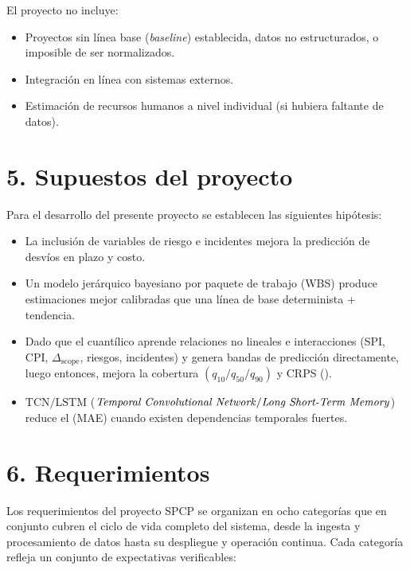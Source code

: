 \documentclass[12pt]
{charter}
\begin{document}
El proyecto no incluye:
\begin{itemize}
	\item Proyectos sin línea base (\textit{baseline}) establecida, datos no estructurados, o imposible de ser normalizados.
	\item Integración en línea con sistemas externos.
	\item Estimación de recursos humanos a nivel individual (si hubiera faltante de datos). 
\end{itemize}

\section{5. Supuestos del proyecto}
\label{sec:supuestos}

Para el desarrollo del presente proyecto se establecen las siguientes hipótesis:

\begin{itemize}
	\item La inclusión de variables de riesgo e incidentes mejora la predicción de desvíos en plazo y costo.
	\item Un modelo jerárquico bayesiano por paquete de trabajo (WBS) produce estimaciones mejor calibradas que una línea de base determinista + tendencia.
	\item Dado que el  cuantílico aprende relaciones no lineales e interacciones (SPI, CPI, $\Delta_{\text{scope}}$, riesgos, incidentes) y genera bandas de predicción directamente, luego entonces, mejora la cobertura $(q_{10}/q_{50}/q_{90})$ y CRPS ().
	\item $\text{TCN} / \text{LSTM}$ ($\text{\textit{Temporal Convolutional Network}} / \text{\textit{Long Short-Term Memory}}$) reduce el  (MAE) cuando existen dependencias temporales fuertes.
\end{itemize}


\section{6. Requerimientos}
\label{sec:requerimientos}

Los requerimientos del proyecto SPCP se organizan en ocho categorías que en conjunto cubren el ciclo de vida completo del sistema, desde la ingesta y procesamiento de datos hasta su despliegue y operación continua. 
Cada categoría refleja un conjunto de expectativas verificables: 
\end{document}

